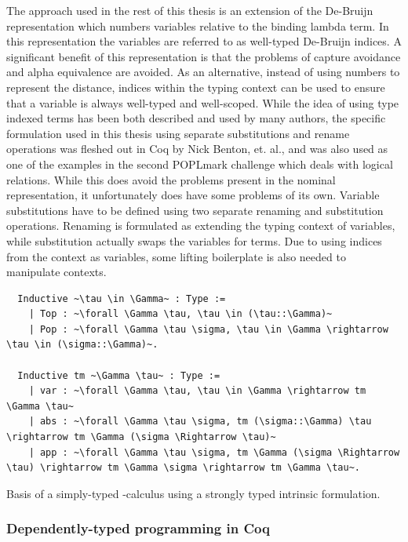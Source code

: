 \documentclass[11pt, final]{article}
\begin{document}
The approach used in the rest of this thesis is an extension of the De-Bruijn representation which numbers variables relative to the binding lambda term.
In this representation the variables are referred to as well-typed De-Bruijn indices.
A significant benefit of this representation is that the problems of capture avoidance and alpha equivalence are avoided.
As an alternative, instead of using numbers to represent the distance, indices within the typing context can be used to ensure that a variable is always well-typed and well-scoped.
While the idea of using type indexed terms has been both described and used by many authors\cite{Altenkirch99}\cite{McBride04}\cite{Adams06}, the specific formulation used in this thesis using separate substitutions and rename operations was fleshed out in Coq by Nick Benton, et. al.\cite{Benton2011}, and was also used as one of the examples in the second POPLmark challenge which deals with logical relations\cite{poplmark_reloaded}.
While this does avoid the problems present in the nominal representation, it unfortunately does have some problems of its own.
Variable substitutions have to be defined using two separate renaming and substitution operations.
Renaming is formulated as extending the typing context of variables, while substitution actually swaps the variables for terms.
Due to using indices from the context as variables, some lifting boilerplate is also needed to manipulate contexts.

\begin{listing}[h]
  \begin{verbatim}
  Inductive ~\tau \in \Gamma~ : Type :=
    | Top : ~\forall \Gamma \tau, \tau \in (\tau::\Gamma)~
    | Pop : ~\forall \Gamma \tau \sigma, \tau \in \Gamma \rightarrow \tau \in (\sigma::\Gamma)~.

  Inductive tm ~\Gamma \tau~ : Type :=
    | var : ~\forall \Gamma \tau, \tau \in \Gamma \rightarrow tm \Gamma \tau~
    | abs : ~\forall \Gamma \tau \sigma, tm (\sigma::\Gamma) \tau \rightarrow tm \Gamma (\sigma \Rightarrow \tau)~
    | app : ~\forall \Gamma \tau \sigma, tm \Gamma (\sigma \Rightarrow \tau) \rightarrow tm \Gamma \sigma \rightarrow tm \Gamma \tau~.
  \end{verbatim}
  \caption{Basis of a simply-typed \lambda-calculus using a strongly typed intrinsic formulation.}
  \label{lst:strong_stlc}
\end{listing}

\subsubsection{Dependently-typed programming in Coq}
\end{document}
